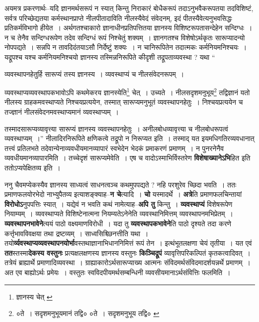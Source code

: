 \documentclass[article,12pt,a4paper]{memoir}
\begin{document}
	  \pstart अयमत्र प्रकरणार्थः--यदि ज्ञानमर्थसरूपं न स्यात् किन्तु निराकारं बोधैकरूपं तदाऽनुभवैकरूपतया तदविशिष्टं, सर्वत्र परिच्छेद्यतया कर्मस्थानप्राप्ते नीलपीतादाविति नीलस्यैवेदं संवेदनम्, इदं पीतस्यैवेत्यनुभवसिद्धः प्रतिकर्मविभागो हीयेत । \leavevmode{}अर्थगतश्चाकारो ज्ञानाधीनप्रतिपत्तितया ज्ञानस्य विशिष्टरूपतासन्देहेन सन्दिग्धः । न च तेनैव सन्दिग्धरूपेण तदेव सन्दिग्धं रूपं निश्चेतुं शक्यम् । ज्ञानगतश्च विशेषोऽर्थकृतः सारूप्यादन्यो नोपपद्यते । सन्नपि न तावदिदंतयाऽसौ निर्देष्टुं शक्यः । न चानिरूपितेन तदात्मकः कर्मनियमनिश्चयः । यद्रूपश्च यश्च कर्मनियमनिश्चयो ज्ञानस्य तस्मिन्ननिरूपिते कीदृशी तद्रूपताव्यवस्था ? यथा  \leavevmode{} “
	  
	व्यवस्थापनहेतुर्हि सारूप्यं तस्य ज्ञानस्य । व्यवस्थाप्यं च नीलसंवेदनरूपम् । 
	  
	व्यवस्थाप्यव्यवस्थापकभावोऽपि कथमेकरय ज्ञानस्येति\footnote{ज्ञानस्य चेत् \cite{dp-msA} \cite{dp-msC} \cite{dp-edP}} चेत् । उच्यते । नीलसदृशमनुभूय\footnote{०ते । सदृशमनुभूयमानं तद्वि० \cite{dp-msA} \cite{dp-msB} \cite{dp-edP} \cite{dp-edH} \cite{dp-edE} \cite{dp-edN} ०ते । सदृशमनुभूय तद्वि० \cite{dp-msC} \cite{dp-msD}} तद्विज्ञानं यतो नीलस्य ग्राहकमवस्थाप्यते निश्चयप्रत्ययेन, तस्मात् सारूप्यमनुभूतं व्यवस्थापनहेतुः । निश्चयप्रत्ययेन च तज्ज्ञानं नीलसंवेदनमवस्थाप्यमानं व्यवस्थाप्यम् । 
	  
	तस्मादसारूप्यव्यावृत्त्या सारूप्यं ज्ञानस्य व्यवस्थापनहेतुः । अनीलबोधव्यावृत्त्या च नीलबोधरूपत्वं व्यवस्थाप्यम् ।” नीलादिरनिरूपिते क्षणिकत्वे तद्रूपो न निरूप्यत इति । तस्माद् यत इयमधिगतिरव्यवधानात् तत्त्वं प्रतिलभते तदेवान्येनाव्यवधीयमानव्यापारं स्वभेदेन भेदकं प्रमाकरणं प्रमाणम् । न पुनरनेनैव व्यवधीयमानव्यापारमिति । तच्चेदृशं सारूप्यमेवेति । एष च वादोऽस्माभिर्विस्तरेण \textbf{विशेषाख्यानेऽभि}हित इति ततोऽप्यपेक्षितव्य इति ।
	\pend
      

	  \pstart ननु चैवमप्येकस्यैव ज्ञानस्य साध्यत्वं साधनत्वञ्च कथमुपपद्यते ? नहि परशुरेव च्छिदा भवति । ततः प्रमाणफलयोरभेदो नाभ्युपैतव्य इत्याशङ्क्याह--\textbf{न चे}त्यादि । \textbf{चो} यस्मादर्थे । \textbf{अत्रे}ति प्रमाणफलचिन्तायां \textbf{विरोधोऽ}नुपपत्तिः स्यात् । यद्येवं न भवति कथं नामेत्याह--\textbf{अपि तु} किन्तु । \textbf{व्यवस्थाप्यं} विशेषरूपेण नियाम्यम् । व्यवस्थाप्यते विशिष्टेनात्मना नियम्यतेऽनेनेति व्यवस्थानिमित्तम् व्यवस्थापनमभिप्रेतम् । \textbf{व्यवस्थापनभावेने}त्ययं पाठो वक्ष्यमाणविरोधी । यदा तु \textbf{व्यवस्थापकभावेने}ति पाठो दृश्यते तदा करणे कर्त्तृभावविवक्षया तथा द्रष्टव्यम् । साध्वसिश्च्छिनत्तीति यथा । तयो\textbf{र्व्यवस्थाप्यव्यवस्थापनयोर्भा}वस्तथाज्ञानाभिधाननिमित्तं रूपं तेन । इत्थंभूतलक्षणा चेयं तृतीया । यत एवं \textbf{तत}स्तस्मा\textbf{देकस्य वस्तुनः} प्रत्यक्षलक्षणस्य ज्ञानस्य वस्तुनः \textbf{किञ्चिद्रूपं} व्यावृत्तिपरिकल्पितं कृतकत्वादिवत् । तत्रेयं ब्राह्यार्थे प्रमाणादिव्यवस्था । ग्राह्याकारोऽर्थसारूप्याख्य आत्मनः संविदमर्थसंविदमादर्शयन्नर्थे प्रमाणम् । अत एव बाह्योऽर्थः प्रमेयः । वस्तुतः स्वविदपीयमर्थसम्बन्धिनी व्यवसीयमानाऽर्थसंवित्तिः फलमिति ।
	\pend
      
\end{document}
